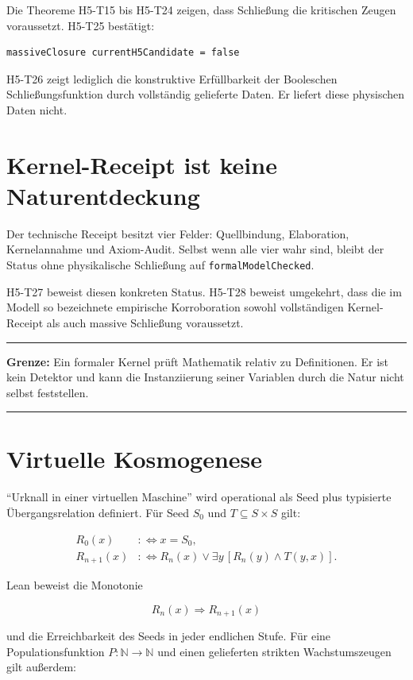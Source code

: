 \documentclass[11pt,a4paper]{article}
\newcommand{\code}[1]{\texttt{#1}}
\newenvironment{claimbox}{%
  \begin{center}\begin{minipage}{0.92\textwidth}
  \color{qikblue}\hrule\vspace{0.7em}\color{black}
}{%
  \vspace{0.7em}\color{qikblue}\hrule\end{minipage}\end{center}
}
\begin{document}
Die Theoreme H5-T15 bis H5-T24 zeigen, dass Schließung die kritischen Zeugen
voraussetzt. H5-T25 bestätigt:

\begin{lstlisting}
massiveClosure currentH5Candidate = false
\end{lstlisting}

H5-T26 zeigt lediglich die konstruktive Erfüllbarkeit der Booleschen
Schließungsfunktion durch vollständig gelieferte Daten. Er liefert diese
physischen Daten nicht.

\section{Kernel-Receipt ist keine Naturentdeckung}

Der technische Receipt besitzt vier Felder: Quellbindung, Elaboration,
Kernelannahme und Axiom-Audit. Selbst wenn alle vier wahr sind, bleibt der
Status ohne physikalische Schließung auf \code{formalModelChecked}.

H5-T27 beweist diesen konkreten Status. H5-T28 beweist umgekehrt, dass die im
Modell so bezeichnete empirische Korroboration sowohl vollständigen
Kernel-Receipt als auch massive Schließung voraussetzt.

\begin{claimbox}
\textbf{Grenze:} Ein formaler Kernel prüft Mathematik relativ zu Definitionen.
Er ist kein Detektor und kann die Instanziierung seiner Variablen durch die
Natur nicht selbst feststellen.
\end{claimbox}

\section{Virtuelle Kosmogenese}

``Urknall in einer virtuellen Maschine'' wird operational als Seed plus
typisierte Übergangsrelation definiert. Für Seed \(S_0\) und
\(T\subseteq S\times S\) gilt:

\[
\begin{aligned}
R_0(x)&:\Leftrightarrow x=S_0,\\
R_{n+1}(x)&:\Leftrightarrow R_n(x)
\lor\exists y\,[R_n(y)\land T(y,x)].
\end{aligned}
\]

Lean beweist die Monotonie

\[
R_n(x)\Rightarrow R_{n+1}(x)
\]

und die Erreichbarkeit des Seeds in jeder endlichen Stufe. Für eine
Populationsfunktion \(P:\mathbb N\to\mathbb N\) und einen gelieferten
strikten Wachstumszeugen gilt außerdem:
\end{document}
